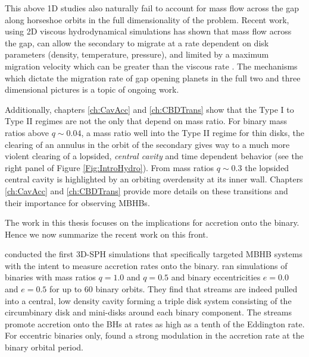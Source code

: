 This above 1D studies also naturally fail to account for mass flow across the
gap along horseshoe orbits in the full dimensionality of the problem. Recent
work, using 2D viscous hydrodynamical simulations has shown that mass flow
across the gap, can allow the secondary to migrate at a rate dependent on disk
parameters (density, temperature, pressure), and limited by a maximum migration
velocity which can be greater than the viscous rate \citep{Edgar:2008,
DuffellFTV:2014, DurmannKley:2015}. The mechanisms which dictate the migration
rate of gap opening planets in the full two and three dimensional pictures is
a topic of ongoing work.



Additionally, chapters \ref{ch:CavAcc} \citep{DHM:2013:MNRAS} and \ref{ch:CBDTrans}
\citep{D'Orazio:CBDTrans:2016} show that the Type I to Type II regimes are not
the only that depend on mass ratio. For binary mass ratios above $q\sim0.04$,
a mass ratio well into the Type II regime for thin disks, the clearing of an
annulus in the orbit of the secondary gives way to a much more violent
clearing of a lopsided, \emph{central cavity} and time dependent behavior (see the right panel of Figure \ref{Fig:IntroHydro}).
From mass ratios $q \sim 0.3$ the lopsided central cavity is highlighted by an
orbiting overdensity at its inner wall. Chapters \ref{ch:CavAcc} and
\ref{ch:CBDTrans} provide more details on these transitions and their
importance for observing MBHBs.




The work in this thesis focuses on the implications for accretion onto the binary. Hence we now summarize the recent work on this front.


\cite{Hayasaki:2007} conducted the first 3D-SPH simulations that specifically
targeted MBHB systems with the intent to measure accretion rates onto the
binary. \cite{Hayasaki:2007} ran simulations of binaries with mass ratios
$q=1.0$ and $q=0.5$ and binary eccentricities $e=0.0$ and $e=0.5$ for up to 60
binary orbits. They find that streams are indeed pulled into a central, low
density cavity forming a triple disk system \citep{Hayasaki+2008} consisting of
the circumbinary disk and mini-disks around each binary component. The streams
promote accretion onto the BHs at rates as high as a tenth of the Eddington
rate. For eccentric binaries only, \cite{Hayasaki:2007} found a strong modulation in
the accretion rate at the binary orbital period. 

